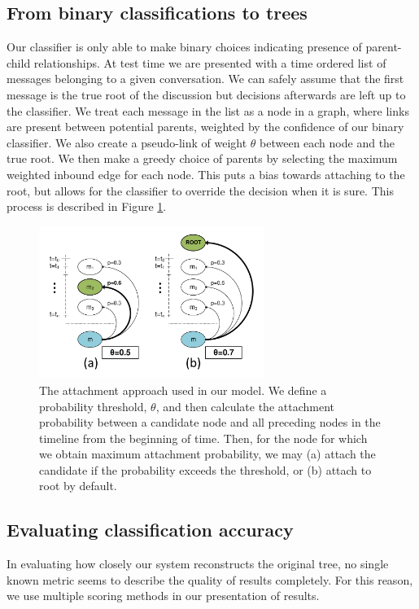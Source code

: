\documentclass{article}
\begin{document}
\subsection{From binary classifications to trees}
Our classifier is only able to make binary choices indicating presence of
parent-child relationships. At test time we are presented with a time ordered
list of messages belonging to a given conversation. We can safely assume that
the first message is the true root of the discussion but decisions afterwards
are left up to the classifier. We treat each message in the list as a node in
a graph, where links are present between potential parents, weighted by the
confidence of our binary classifier. We also create a pseudo-link of weight
$\theta$ between each node and the true root. We then make a greedy choice of
parents by selecting the maximum weighted inbound edge for each node. This
puts a bias towards attaching to the root, but allows for the classifier to
override the decision when it is sure. This process is described in Figure
\ref{fig:treemaker}.

\begin{figure}
  \centering
  \includegraphics[width=0.65\textwidth]{attachment.pdf}
  \caption{The attachment approach used in our model. We define a probability threshold, 
  $\theta$, and then calculate the attachment probability between a candidate
  node and all preceding nodes in the timeline from the beginning of time.
  Then, for the node for which we obtain maximum attachment probability, we
  may (a) attach the candidate if the probability exceeds the threshold, or
  (b) attach to root by default.}
  \label{fig:treemaker}
\end{figure}

\subsection{Evaluating classification accuracy}
\label{sec:evaluation}
In evaluating how closely our system reconstructs the original tree, no single
known metric seems to describe the quality of results completely. For this
reason, we use multiple scoring methods in our presentation of results.
\end{document}
